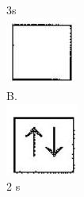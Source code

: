 \documentclass[10pt]{article}
\begin{document}
3s\\
\includegraphics[max width=\textwidth, center]{2025_10_23_76620c17ffac1ae9b35bg-12(6)}\\
B.\\
\includegraphics[max width=\textwidth, center]{2025_10_23_76620c17ffac1ae9b35bg-12(2)}\\
2 s
\end{document}
